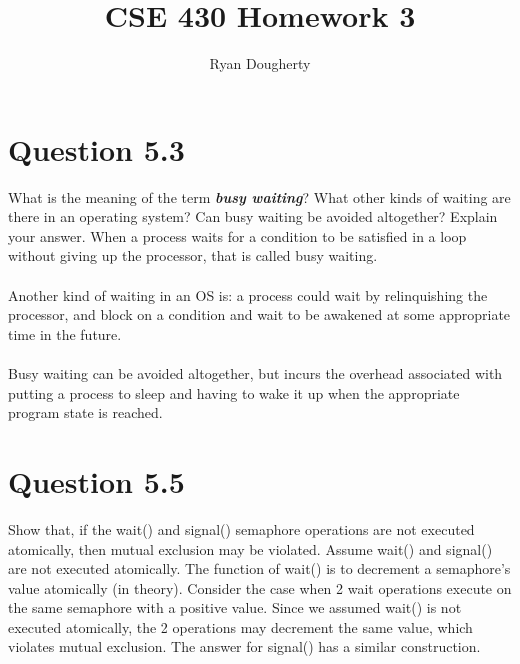 \documentclass[12pt]{article}
\title{CSE 430 Homework 3}
\author{Ryan Dougherty}
\date{}                                           %
\begin{document}
\maketitle

\section*{Question 5.3} {\color{blue}What is the meaning of the term \textbf{\emph{busy waiting}}? What other kinds of waiting are there in an operating system? Can busy waiting be avoided altogether? Explain your answer.} 
When a process waits for a condition to be satisﬁed in a loop without giving up the processor, that is called busy waiting.
\\ \\
Another kind of waiting in an OS is: a process could wait by relinquishing the processor, and block on a condition and wait to be awakened at some appropriate time in the future. 
\\ \\
Busy waiting can be avoided altogether, but incurs the overhead associated with putting a process to sleep and having to wake it up when the appropriate program state is reached.

\section*{Question 5.5} {\color{blue}Show that, if the wait() and signal() semaphore operations are not executed atomically, then mutual exclusion may be violated.} 
Assume wait() and signal() are not executed atomically. The function of wait() is to decrement a semaphore's value atomically (in theory). Consider the case when 2 wait operations execute on the same semaphore with a positive value. Since we assumed wait() is not executed atomically, the 2 operations may decrement the same value, which violates mutual exclusion. The answer for signal() has a similar construction.
\end{document}
